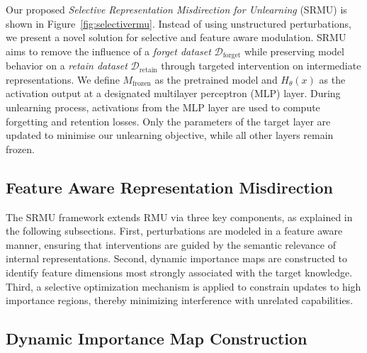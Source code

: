 Our proposed \emph{Selective Representation Misdirection for Unlearning} (SRMU) is shown in Figure~\ref{fig:selectivermu}. Instead of using unstructured perturbations, we present a novel solution for selective and feature aware modulation.
SRMU aims to remove the influence of a \emph{forget dataset} $\mathcal{D}_{\text{forget}}$ while preserving model behavior on a \emph{retain dataset} $\mathcal{D}_{\text{retain}}$ through targeted intervention on intermediate representations.
We define $M_{\text{frozen}}$ as the pretrained model and $H_{\theta}(x)$ as the activation output at a designated multilayer perceptron (MLP) layer.
During unlearning process, activations from the MLP layer are used to compute forgetting and retention losses. Only the parameters of the target layer are updated to minimise our unlearning objective, while all other layers remain frozen.

\subsection{Feature Aware Representation Misdirection}

The SRMU framework extends RMU via three key components, as explained in the following subsections.
First, perturbations are modeled in a feature aware manner, ensuring that interventions are guided by the semantic relevance of internal representations.
Second, dynamic importance maps are constructed to identify feature dimensions most strongly associated with the target knowledge.
Third, a selective optimization mechanism is applied to constrain updates to high importance regions, thereby minimizing interference with unrelated capabilities.

\subsection{Dynamic Importance Map Construction}\label{sec:importance_modeling}


